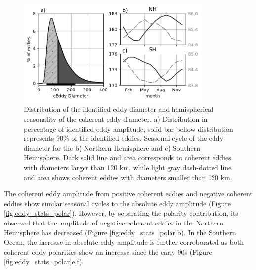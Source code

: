 \documentclass[draft,linenumbers]{agujournal2019}
\begin{document}
	\begin{figure}
	    \centering
	    \includegraphics[width=95mm]{figures/eddy_diameter_seasonal.pdf}
	    \caption{Distribution of the identified eddy diameter and hemispherical seasonality of the coherent eddy diameter. a) Distribution in percentage of identified eddy amplitude, solid bar bellow distribution represents 90\% of the identified eddies. Seasonal cycle of the eddy diameter for the b) Northern Hemisphere and c) Southern Hemisphere. Dark solid line and area corresponds to coherent eddies with diameters larger than 120 km, while light gray dash-dotted line and area shows coherent eddies with diameters smaller than 120 km.}
	    \label{fig:eddy_diameter}
	\end{figure}

	The coherent eddy amplitude from positive coherent eddies and negative coherent eddies show similar seasonal cycles to the absolute eddy amplitude (Figure \ref{fig:eddy_stats_polar}). However, by separating the polarity contribution, its observed that the amplitude of negative coherent eddies in the Northern Hemisphere has decreased (Figure \ref{fig:eddy_stats_polar}b). In the Southern Ocean, the increase in absolute eddy amplitude is further corroborated as both coherent eddy polarities show an increase since the early 90s (Figure \ref{fig:eddy_stats_polar}e,f).


\end{document}
